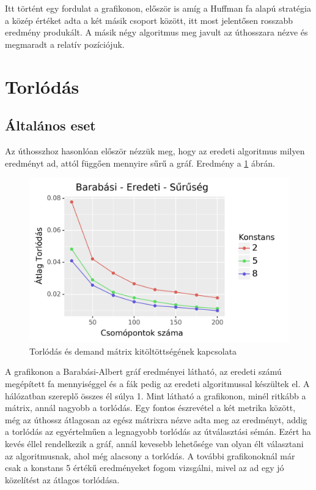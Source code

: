 \documentclass[12pt]{report}
\begin{document}
Itt történt egy fordulat a grafikonon, először is amíg a Huffman fa alapú stratégia a közép értéket adta a két másik csoport között, itt most jelentősen rosszabb eredmény produkált.
A másik négy algoritmus meg javult az úthosszara nézve és megmaradt a relatív pozíciójuk.

\section{Torlódás}

\subsection{Általános eset}

Az úthosszhoz hasonlóan először nézzük meg, hogy az eredeti algoritmus milyen eredményt ad, attól függően mennyire sűrű a gráf.
Eredmény a \ref{density-con} ábrán.

\begin{figure}[H]
	\begin{center}
		\includegraphics[width=0.9\linewidth]{pictures/density_con.png}
		\caption{Torlódás és demand mátrix kitöltöttségének kapcsolata }
		\label{density-con}
	\end{center}
\end{figure}

A grafikonon a Barabási-Albert gráf eredményei látható, az eredeti számú megépített fa mennyiséggel és a fák pedig az eredeti algoritmussal készültek el.
A hálózatban szereplő összes él súlya 1.
Mint látható a grafikonon, minél ritkább a mátrix, annál nagyobb a torlódás. 
Egy fontos észrevétel a két metrika között, még az úthossz átlagosan az egész mátrixra nézve adta meg az eredményt, addig a torlódás az egyértelműen a legnagyobb torlódás az útválasztási sémán.
Ezért ha kevés éllel rendelkezik a gráf, annál kevesebb lehetősége van olyan élt választani az algoritmusnak, ahol még alacsony a torlódás.
A további grafikonoknál már csak a konstans 5 értékű eredményeket fogom vizsgálni, mivel az ad egy jó közelítést az átlagos torlódása.
\end{document}
